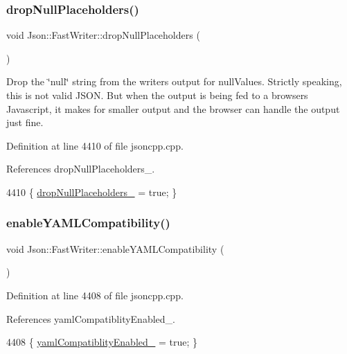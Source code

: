 \subsubsection{\texorpdfstring{drop\+Null\+Placeholders()}{dropNullPlaceholders()}}
{\footnotesize\ttfamily void Json\+::\+Fast\+Writer\+::drop\+Null\+Placeholders (\begin{DoxyParamCaption}{ }\end{DoxyParamCaption})}



Drop the \char`\"{}null\char`\"{} string from the writer\textquotesingle{}s output for null\+Values. Strictly speaking, this is not valid J\+S\+ON. But when the output is being fed to a browser\textquotesingle{}s Javascript, it makes for smaller output and the browser can handle the output just fine. 



Definition at line 4410 of file jsoncpp.\+cpp.



References drop\+Null\+Placeholders\+\_\+.


\begin{DoxyCode}
4410 \{ \hyperlink{class_json_1_1_fast_writer_a97e9d4ff84b59a48756dcc27a71b5904}{dropNullPlaceholders\_} = \textcolor{keyword}{true}; \}
\end{DoxyCode}
\mbox{\label{class_json_1_1_fast_writer_a78d98e9f76d33660ad6e6a1abe287d45}} 
\subsubsection{\texorpdfstring{enable\+Y\+A\+M\+L\+Compatibility()}{enableYAMLCompatibility()}}
{\footnotesize\ttfamily void Json\+::\+Fast\+Writer\+::enable\+Y\+A\+M\+L\+Compatibility (\begin{DoxyParamCaption}{ }\end{DoxyParamCaption})}



Definition at line 4408 of file jsoncpp.\+cpp.



References yaml\+Compatiblity\+Enabled\+\_\+.


\begin{DoxyCode}
4408 \{ \hyperlink{class_json_1_1_fast_writer_a4c4c1911179bf472d24492915b0e489a}{yamlCompatiblityEnabled\_} = \textcolor{keyword}{true}; \}
\end{DoxyCode}
\mbox{\label{class_json_1_1_fast_writer_af4ee077d365d75941fb2688d97207a55}} 
